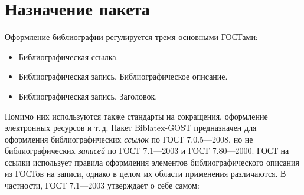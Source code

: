 \documentclass[10pt,a4paper,headings=small,numbers=enddot,english,russian]{ltxdockit}
\newcommand*{\biber}{Biber\xspace}
\newcommand*{\biblatex}{Biblatex\xspace}
\newcommand*{\biblatexgost}{Biblatex-GOST\xspace}
\newcommand*{\gostbibname}[1][]{ГОСТ#1 7.1---2003\xspace}
\newcommand*{\gostcitename}[1][]{ГОСТ#1 7.0.5---2008\xspace}
\newcommand*{\gostheadname}[1][]{ГОСТ#1 7.80---2000\xspace}
\begin{document}
%
%

\section{Назначение пакета}
\label{sec:whatfor}

Оформление библиографии регулируется тремя основными ГОСТами:

\newlength{\templ}\settowidth{\templ}{\gostcitename~}
\begin{itemize}[labelwidth=\templ,leftmargin=!,align=left,noitemsep]
  \item[\gostcitename] Библиографическая ссылка.
  \item[\gostbibname] Библиографическая запись. Библиографическое описание.
  \item[\gostheadname] Библиографическая запись. Заголовок.
\end{itemize}
Помимо них используются также стандарты на сокращения, оформление электронных ресурсов и т.\,д.
Пакет \biblatexgost предназначен для оформления библиографических \emph{ссылок} по \gostcitename,
  но не библиографических \emph{записей} по \gostbibname и \gostheadname.
ГОСТ на ссылки использует правила оформления элементов библиографического описания из
  ГОСТов на записи, однако в целом их области применения различаются.
В частности, \gostbibname утверждает о себе самом:
\end{document}
